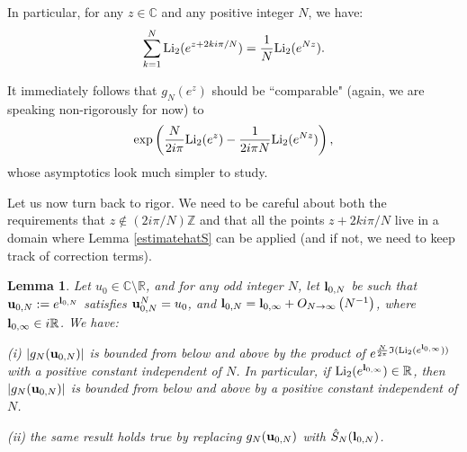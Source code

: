 \documentclass[11pt]{amsart}
\newtheorem{lem}[teo]{Lemma}
\newcommand{\mr}{\mathbb{R}}
\newcommand{\mc}{\mathbb{C}}
\newcommand{\C}{\mathbb{C}}
\newcommand{\Z}{\mathbb{Z}}
\newcommand{\bu}{{\bf u}}
\newcommand{\bl}{{\bf l}}
\begin{document}
{In particular, for any $z \in \C$ and any positive integer $N$, we have:
$$ \sum_{k=1}^N {\rm Li_2}(e^{z+2ki\pi/N})=\dfrac{1}{N} {\rm Li_2}(e^{Nz}).$$

It immediately follows that $g_N(e^z)$ should be ``comparable" (again, we are speaking non-rigorously for now) to 
\begin{equation}\label{ratiogNclassmars25}
\exp\left( \frac{N}{2i\pi}{\rm Li_2}(e^z)- \frac{1}{2i\pi N}{\rm Li_2}(e^{Nz})\right),
\end{equation}
whose asymptotics look much simpler to study.

Let us now turn back to rigor. We need to be careful about both the requirements that $z \notin (2 i \pi/N) \Z$ and that all the points  $z+2ki\pi/N$ live in a domain where Lemma \ref{estimatehatS} can be applied (and if not, we need to keep track of correction terms).

\begin{lem}\label{factorest} Let $u_0\in \mc\setminus \mr$, and for any odd integer $N$, let $\bl_{0,N}$ be such that $\bu_{0,N}:= e^{\bl_{0,N}}$ satisfies $\bu_{0,N}^N = u_0$, and $\bl_{0,N} = \bl_{0,\infty} + O_{N\to \infty}\left (N^{-1}\right )$, where $\bl_{0,\infty}\in i\mr$. We have:

(i) $\vert g_N(\bu_{0,N})\vert$ is bounded from below and above by the product of $e^{\frac{N}{2\pi} \mathfrak{I}({\rm Li_2}(e^{\bl_{0,\infty}}))}$ with a positive constant independent of $N$. In particular, if ${\rm Li_2}(e^{\bl_{0,\infty}})\in \mr$, then $\vert g_N(\bu_{0,N})\vert$ is bounded from below and above by a positive constant independent of $N$.

(ii) the same result holds true by replacing $g_N(\bu_{0,N})$ with $\hat{S}_N(\bl_{0,N})$. 		
\end{lem}

}
\end{document}
